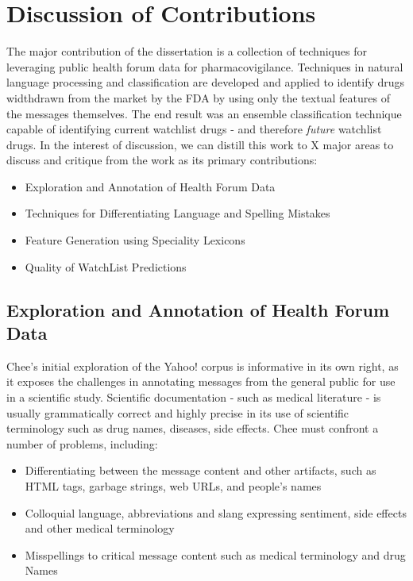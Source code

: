 \documentclass[twoside,11pt]{article}
\begin{document}
\section{Discussion of Contributions}
The major contribution of the dissertation is a collection of techniques for leveraging public health forum data for pharmacovigilance. Techniques in natural language processing and classification are developed and applied to identify drugs widthdrawn from the market by the FDA by using only the textual features of the messages themselves. The end result was an ensemble classification technique capable of identifying current watchlist drugs - and therefore \textit{future} watchlist drugs.  In the interest of discussion, we can distill this work to X major areas to discuss and critique from the work as its primary contributions:
\begin{itemize}
  \item Exploration and Annotation of Health Forum Data
  \item Techniques for Differentiating Language and Spelling Mistakes
  \item Feature Generation using Speciality Lexicons
  \item Quality of WatchList Predictions
\end{itemize}

\subsection{Exploration and Annotation of Health Forum Data}
Chee's initial exploration of the Yahoo! corpus is informative in its own right, as it exposes the challenges in annotating messages from the general public for use in a scientific study. Scientific documentation - such as medical literature - is usually grammatically correct and highly precise in its use of scientific terminology such as drug names, diseases, side effects. Chee must confront a number of problems, including:
\begin{itemize}
  \item Differentiating between the message content and other artifacts, such as HTML tags, garbage strings, web URLs, and people's names
  \item Colloquial language, abbreviations and slang expressing sentiment, side effects and other medical terminology
  \item Misspellings to critical message content such as medical terminology and drug Names
\end{itemize}
\end{document}
